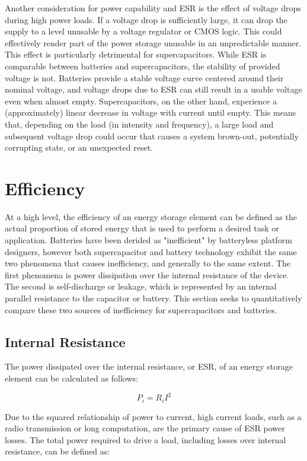 Another consideration for power capability and ESR is the effect of voltage drops during high power loads. If a voltage drop is sufficiently large, it can drop the supply to a level unusable by a voltage regulator or CMOS logic. This could effectively render part of the power storage unusable in an unpredictable manner. This effect is particularly detrimental for supercapacitors. While ESR is comparable between batteries and supercapacitors, the stability of provided voltage is not. Batteries provide a stable voltage curve centered around their nominal voltage, and voltage drops due to ESR can still result in a usable voltage even when almost empty. Supercapacitors, on the other hand, experience a (approximately) linear decrease in voltage with current until empty. This means that, depending on the load (in intensity and frequency), a large load and subsequent voltage drop could occur that causes a system brown-out, potentially corrupting state, or an unexpected reset. 


\section{Efficiency}
\label{sec:supercapvbattery}
At a high level, the efficiency of an energy storage element can be defined as the actual proportion of stored energy that is used to perform a desired task or application. Batteries have been derided as "inefficient" by batteryless platform designers, however
both supercapacitor and battery technology exhibit the same two phenomena that causes inefficiency, and generally to the same extent. 
The first phenomena is power dissipation over the internal resistance of the device. The second is self-discharge or leakage, which is represented by an internal parallel resistance to the capacitor or battery.
This section seeks to quantitatively compare these two sources of inefficiency for supercapacitors and batteries.

\subsection{Internal Resistance}
The power dissipated over the internal resistance, or ESR, of an energy storage element can be calculated as follows:

$$P_{i} = R_{i} I^2$$

\noindent Due to the squared relationship of power to current, high current loads, such as a radio transmission or long computation, are the primary cause of ESR power losses. The total power required to drive a load, including losses over internal resistance, can be defined as:

